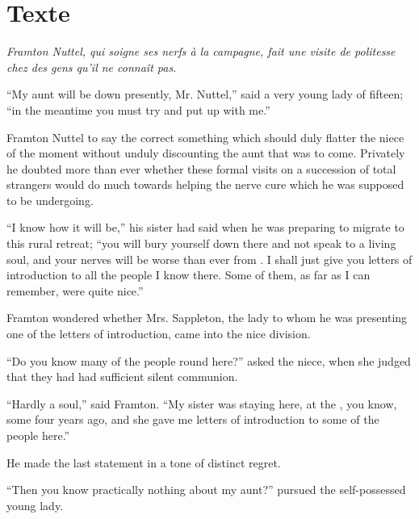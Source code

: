 \documentclass{fiche}
\begin{document}

\newpage
\section{Texte}

\noindent\small\textit{Framton Nuttel, qui soigne ses nerfs à la campagne, fait une visite de
politesse chez des gens qu'il ne connaît pas.}\normalsize

\begin{texte}
``My aunt will be down presently, Mr. Nuttel,'' said a very
 young lady of fifteen; ``in the meantime
you must try and put up with me.''

Framton Nuttel  to say the correct something
which should duly flatter the niece of the moment without unduly discounting the aunt that
was to come. Privately he doubted more than ever whether these formal visits on a succession
of total strangers would do much towards helping the nerve cure which he was supposed to be
undergoing.

``I know how it will be,'' his sister had said when he was preparing to migrate to this rural
retreat; ``you will bury yourself down there and not speak to a living soul, and your nerves
will be worse than ever from . I shall just give you
letters of introduction to all the people I know there. Some of them, as far as I can
remember, were quite nice.''

Framton wondered whether Mrs. Sappleton, the lady to whom he was presenting one of the
letters of introduction, came into the nice division.

``Do you know many of the people round here?'' asked the niece, when she judged that they had
had sufficient silent communion.

``Hardly a soul,'' said Framton. ``My sister was staying here, at the
, you know, some four years ago, and she gave me
letters of introduction to some of the people here.''

He made the last statement in a tone of distinct regret.

``Then you know practically nothing about my aunt?'' pursued the self-possessed young lady.


\end{texte}
\end{document}
